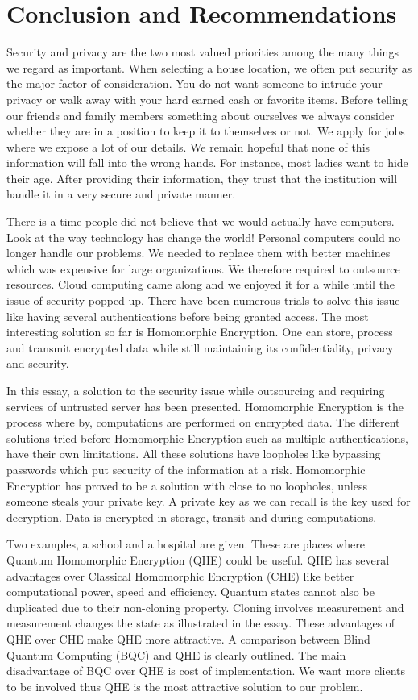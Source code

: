 \chapter{Conclusion and Recommendations}
Security and privacy are the two most valued priorities among the many things we regard as
 important. When selecting a house location, we often put security as the major factor of consideration. You do not want someone to intrude your privacy or walk away with your hard earned cash or favorite items. Before telling our friends and family members something about ourselves we always consider whether they are in a position to keep it to themselves or not. We apply for jobs where we expose a lot of our details. We remain hopeful that none of this information will fall into the wrong hands. For instance, most ladies want to hide their age. After providing their information, they trust that the institution will handle it in a very secure and private manner.

There is a time people did not believe that we would actually have computers. Look at the way technology has change the world! Personal computers could no longer handle our problems. We needed to replace them with better machines which was expensive for large organizations. We therefore required to outsource resources. Cloud computing came along and we enjoyed it for a while until the issue of security popped up. There have been numerous trials to solve this issue like having several authentications before being granted access. The most interesting solution so far is Homomorphic Encryption. One can store, process and transmit encrypted data while still maintaining its confidentiality, privacy and security.

In this essay, a solution to the security issue while outsourcing and requiring services of untrusted server has been presented. Homomorphic Encryption is the process where by, computations are performed on encrypted data. The different solutions tried before Homomorphic Encryption such as multiple authentications, have their own limitations. All these solutions have loopholes like bypassing passwords which put security of the information at a risk. Homomorphic Encryption has proved to be a solution with close to no loopholes, unless someone steals your private key. A private key as we can recall is the key used for decryption. Data is encrypted in storage, transit and during computations.

Two examples, a school and a hospital are given. These are places where Quantum Homomorphic Encryption (QHE) could be useful. QHE has several advantages over Classical Homomorphic Encryption (CHE) like better computational power, speed and efficiency. Quantum states cannot also be duplicated due to their non-cloning property. Cloning involves measurement and measurement changes the state as illustrated in the essay. These advantages of QHE over CHE make QHE more attractive. A comparison between Blind Quantum Computing (BQC) and QHE is clearly outlined. The main disadvantage of BQC over QHE is cost of implementation. We want more clients to be involved thus QHE is the most attractive solution to our problem.

